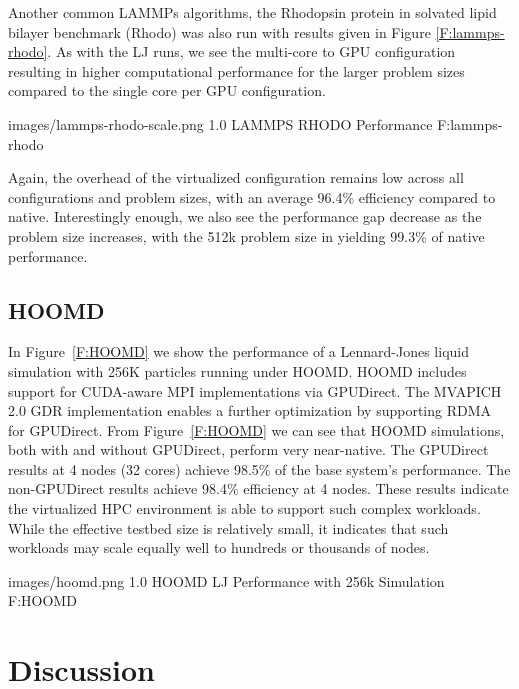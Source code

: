 \documentclass{sigplanconf}
\begin{document}
Another common LAMMPs algorithms, the Rhodopsin protein in solvated lipid bilayer benchmark (Rhodo) was also run with results given in Figure \ref{F:lammps-rhodo}. As with the LJ runs, we see the multi-core to GPU configuration resulting in higher computational performance for the larger problem sizes compared to the single core per GPU configuration.  

  {images/lammps-rhodo-scale.png}
  {1.0}
  {LAMMPS RHODO Performance}
  {F:lammps-rhodo}

Again, the overhead of the virtualized configuration remains low across all configurations and problem sizes, with an average 96.4\% efficiency compared to native. Interestingly enough, we also see the performance gap decrease as the problem size increases, with the 512k problem size in yielding 99.3\% of native performance.




\subsection{HOOMD}






In Figure~\ref{F:HOOMD} we show the performance of a Lennard-Jones liquid
simulation with 256K particles running under HOOMD.  HOOMD includes support for CUDA-aware MPI implementations via GPUDirect.  The MVAPICH 2.0 GDR implementation enables a further optimization by supporting RDMA for GPUDirect. From Figure~\ref{F:HOOMD} we can see that HOOMD simulations, both with and without GPUDirect, perform very near-native.  The GPUDirect results at 4 nodes (32 cores) achieve 98.5\% of the base system's performance.  The non-GPUDirect results achieve 98.4\% efficiency at 4 nodes. These results indicate the virtualized HPC environment is able to support such complex workloads. While the effective testbed size is relatively small, it indicates that such workloads may scale equally well to hundreds or thousands of nodes. 

  {images/hoomd.png}
  {1.0}
  {HOOMD LJ Performance with 256k Simulation}
  {F:HOOMD}


\section{Discussion}
\end{document}
